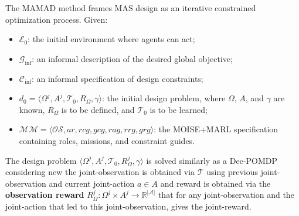 \documentclass[pdflatex,sn-mathphys-num]{sn-jnl}%
\theoremstyle{thmstyleone}%
\theoremstyle{thmstyletwo}%
\theoremstyle{thmstylethree}%
\begin{document}
The MAMAD method frames MAS design as an iterative constrained optimization process. Given:
\begin{itemize}
    \item $\mathcal{E}_0$: the initial environment where agents can act;
    \item $\mathcal{G}_{\text{inf}}$: an informal description of the desired global objective;
    \item $\mathcal{C}_{\text{inf}}$: an informal specification of design constraints;
    \item $d_0 = \langle \Omega^j, A^j, \mathcal{T}_0, R_{\Omega}, \gamma \rangle$: the initial design problem, where $\Omega$, $A$, and $\gamma$ are known, $R_{\Omega}$ is to be defined, and $\mathcal{T}_0$ is to be learned;
    \item $\mathcal{MM} = \langle \mathcal{OS}, ar, rcg, gcg, rag, rrg, grg \rangle$: the MOISE+MARL specification containing roles, missions, and constraint guides.
\end{itemize}

The design problem $\langle \Omega^j, A^j, \mathcal{T}_0, R_{\Omega}^j, \gamma \rangle$ is solved similarly as a Dec-POMDP considering new the joint-observation is obtained via $\mathcal{T}$ using previous joint-observation and current joint-action $a \in A$ and reward is obtained via the \textbf{observation reward} $R^j_{\Omega}: \Omega^j \times A^j \rightarrow \mathbb{R}^{|\mathcal{A}|}$ that for any joint-observation and the joint-action that led to this joint-observation, gives the joint-reward.

\vspace{1em}
\end{document}
